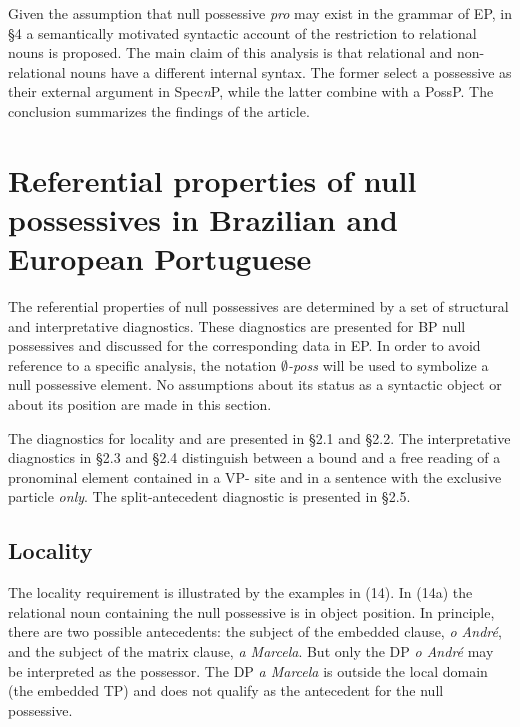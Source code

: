 \documentclass[output=paper]{langsci/langscibook}
\begin{document}
Given the assumption that null possessive \textit{pro} may exist in the grammar of EP, in §4 a semantically motivated syntactic account of the restriction to relational nouns is proposed. The main claim of this analysis is that relational and non-relational nouns have a different internal syntax. The former select a possessive as their external argument in Spec\textit{n}P, while the latter combine with a PossP. The conclusion summarizes the findings of the article.

\section{Referential properties of null possessives in Brazilian and European Portuguese}%

The referential properties of null possessives are determined by a set of structural and interpretative diagnostics. These diagnostics are presented for BP null possessives and discussed for the corresponding data in EP. In order to avoid reference to a specific analysis, the notation \textit{$\emptyset$-poss} will be used to symbolize a null possessive element. No assumptions about its status as a syntactic object or about its position are made in this section.  

The diagnostics for locality and  are presented in §2.1 and §2.2. The interpretative diagnostics in §2.3 and §2.4 distinguish between a bound and a free reading of a pronominal element contained in a VP- site and in a sentence with the exclusive particle \textit{only}. The split-antecedent diagnostic is presented in §2.5.

\subsection{Locality}%

The locality requirement is illustrated by the examples in (14). In (14a) the relational noun containing the null possessive is in object position. In principle, there are two possible antecedents: the subject of the embedded clause, \textit{o André}, and the subject of the matrix clause, \textit{a Marcela}. But only the DP \textit{o André} may be interpreted as the possessor. The DP \textit{a Marcela} is outside the local domain (the embedded TP) and does not qualify as the antecedent for the null possessive. 
\end{document}
